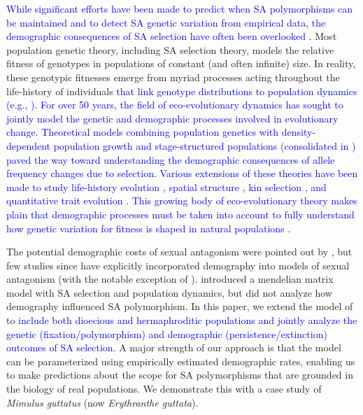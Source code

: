\documentclass[11pt]{article}
\begin{document}
\textcolor{blue}{While significant efforts have been made to predict when SA polymorphisms can be maintained and to detect SA genetic variation from empirical data, the demographic consequences of SA selection have often been overlooked \citep{MatthewsConnallon2019}}. Most population genetic theory, including SA selection theory, models the relative fitness of genotypes in populations of constant (and often infinite) size. In reality, these genotypic fitnesses emerge from myriad processes acting throughout the life-history of individuals \textcolor{blue}{that link genotype distributions to population dynamics (e.g., \citealt {johnston2013life, merot2020balancing}). For over 50 years, the field of eco-evolutionary dynamics has sought to jointly model the genetic and demographic processes involved in evolutionary change. Theoretical models combining population genetics with density-dependent population growth \citep{roughgarden1971density} and stage-structured populations (consolidated in \citealt{Charlesworth_1994}) paved the way toward understanding the demographic consequences of allele frequency changes due to selection. Various extensions of these theories have been made to study life-history evolution \citep{orive1995senescence, orive2001somatic}, spatial structure \citep{ronce2000kin}, kin selection \citep{rousset2004genetic}, and quantitative trait evolution \citep[e.g.,][]{coulson2006putting, barfield2011evolution, childs2016evolution, orive2017effects}. This growing body of eco-evolutionary theory makes plain that demographic processes must be taken into account to fully understand how genetic variation for fitness is shaped in natural populations \citep{metcalf2007evolutionary,coulson2006putting,rueffler2006evolutionary}.}


The potential demographic costs of sexual antagonism were pointed out by \cite{kokko2003sexy}, but few studies since have explicitly incorporated demography into models of sexual antagonism (with the notable exception of \citealt{harts2014demography}). \citet{deVriesCaswell2019a} introduced a mendelian matrix model with SA selection and population dynamics, but did not analyze how demography influenced SA polymorphism. In this paper, we extend the model of \citet{deVriesCaswell2019a,deVriesCaswell2019b} to \textcolor{blue}{include both dioecious and hermaphroditic populations and jointly analyze the genetic (fixation/polymorphism) and demographic (persistence/extinction) outcomes of SA selection}. A major strength of our approach is that the model can be parameterized using empirically estimated demographic rates, enabling us to make predictions about the scope for SA polymorphisms that are grounded in the biology of real populations. We demonstrate this with a case study of {\itshape Mimulus guttatus} (now {\itshape Erythranthe guttata}).
\end{document}
